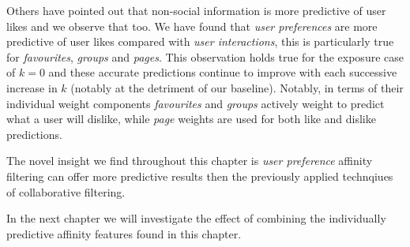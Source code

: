 Others have pointed out that non-social information is more predictive of user likes \cite{www} and we observe that too.
We have found that \emph{user preferences} are more predictive of user likes compared with \emph{user interactions}, this is particularly 
true for \emph{favourites}, \emph{groups} and \emph{pages}. This observation holds true for the exposure case of $k = 0$ and these accurate 
predictions continue to improve with each successive increase in $k$ (notably at the detriment of our baseline). Notably, in terms of their individual weight components
\emph{favourites} and \emph{groups} actively weight to predict what a user will dislike, while \emph{page} weights are used for 
both like and dislike predictions. 

The novel insight we find throughout this chapter is \emph{user preference} affinity filtering can offer more predictive results then the previously 
applied technqiues of collaborative filtering.

In the next chapter we will investigate the effect of combining the individually predictive affinity features found in this chapter.

